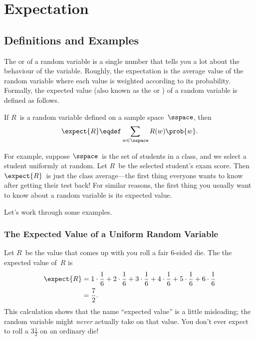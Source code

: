 \chapter{Expectation}\label{chap:expectation}

\begin{problems}
\classproblems
{}

\end{problems}

\section{Definitions and Examples}

The  or  of a random variable
is a single number that tells you a lot about the behaviour of the
variable.  Roughly, the expectation is the average value of the random
variable where each value is weighted according to its probability.
Formally, the expected value (also known as the  or
) of a random variable is defined as follows.

\begin{definition}\label{def:expectation}
If $R$~is a random variable defined on a sample space~$\sspace$, then
\begin{equation}\label{eqn:expectation}
    \expect{R} \eqdef \sum_{w \in \sspace} R(w) \prob{w}.
\end{equation}
\end{definition}

For example, suppose $\sspace$~is the set of students in a class, and
we select a student uniformly at random.  Let $R$~be the selected
student's exam score.  Then $\expect{R}$~is just the class
average---the first thing everyone wants to know after getting their
test back!  For similar reasons, the first thing you usually want to
know about a random variable is its expected value.

Let's work through some examples.

\subsection{The Expected Value of a Uniform Random Variable}

Let $R$~be the value that comes up with you roll a fair 6-sided die.
The the expected value of~$R$ is
\begin{align*}
\expect{R}
    & = 1 \cdot \frac{1}{6} + 2 \cdot \frac{1}{6} + 3 \cdot \frac{1}{6} +
        4 \cdot \frac{1}{6} + 5 \cdot \frac{1}{6} + 6 \cdot \frac{1}{6} \\
    & = \frac{7}{2}.
\end{align*}
%
This calculation shows that the name ``expected value'' is a little
misleading; the random variable might \emph{never} actually take on that
value.  You don't ever expect to roll a $3 \frac{1}{2}$ on an ordinary
die!

